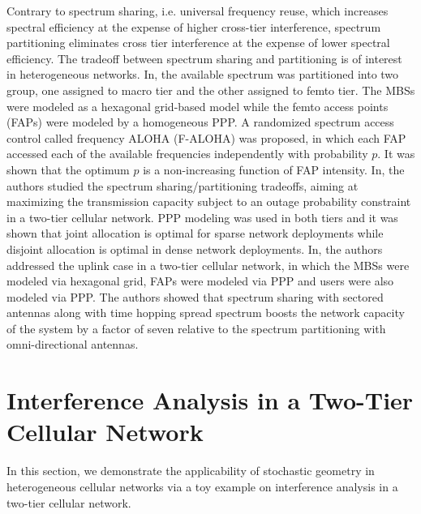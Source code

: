 \documentclass[a4paper,twocolumn]{IEEEtran}
\begin{document}
Contrary to spectrum sharing, i.e. universal frequency reuse, which increases spectral efficiency at the expense of higher cross-tier interference, spectrum partitioning eliminates cross tier interference at the expense of lower spectral efficiency. The tradeoff between spectrum sharing and partitioning is of interest in heterogeneous networks. In\cite{Chandrasekhar2009TC}, the available spectrum was partitioned into two group, one assigned to macro tier and the other assigned to femto tier. The MBSs were modeled as a hexagonal grid-based model while the femto access points (FAPs) were modeled by a homogeneous PPP. A randomized spectrum access control called frequency ALOHA (F-ALOHA) was proposed, in which each FAP accessed each of the available frequencies independently with probability $p$. It was shown that the optimum $p$ is a non-increasing function of FAP intensity. In\cite{Cheung2012JSAC}, the authors studied the spectrum sharing/partitioning tradeoffs, aiming at maximizing the transmission capacity subject to an outage probability constraint in a two-tier cellular network. PPP modeling was used in both tiers and it was shown that joint allocation is optimal for sparse network deployments while disjoint allocation is optimal in dense network deployments. In\cite{Chandr2009TWC}, the authors addressed the uplink case in a two-tier cellular network, in which the MBSs were modeled via hexagonal grid, FAPs were modeled via PPP and users were also modeled via PPP. The authors showed that spectrum sharing with sectored antennas along with time hopping spread spectrum boosts the network capacity of the system by a factor of seven relative to the spectrum partitioning with omni-directional antennas.   
\section{Interference Analysis in a Two-Tier Cellular Network}\label{Sec:Int}
In this section, we demonstrate the applicability of stochastic geometry in heterogeneous cellular networks via a toy example on interference analysis in a two-tier cellular network.
\end{document}
